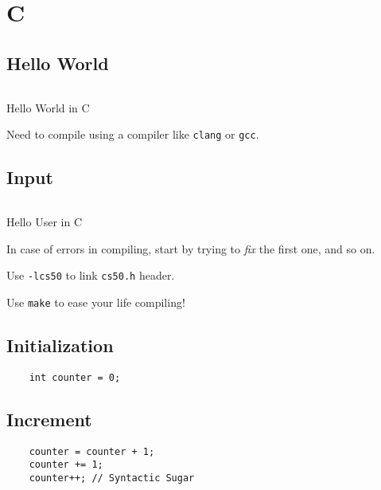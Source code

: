 \chapter{C}
\section{Hello World}
\begin{code}[ht!]
	\inputminted[linenos]{c}{codes/helloWorld.c}
	\caption{Hello World in C}
\end{code}

\begin{remark}
	Need to compile using a compiler like \texttt{clang} or
	\texttt{gcc}.
\end{remark}

\section{Input}
\begin{code}[ht!]
	\inputminted[linenos]{c}{codes/helloUser.c}
	\caption{Hello User in C}
\end{code}

\begin{remark}
	In case of errors in compiling, start by trying to \emph{fix} the first one, and so on.
\end{remark}

\begin{remark}
	Use \texttt{-lcs50} to link \texttt{cs50.h} header.
\end{remark}

\begin{remark}
	Use \texttt{make} to ease your life compiling!
\end{remark}

\clearpage
\section{Initialization}
\begin{verbatim}
	int counter = 0;
\end{verbatim}

\section{Increment}
\begin{verbatim}
	counter = counter + 1;
	counter += 1;
	counter++; // Syntactic Sugar
\end{verbatim}


